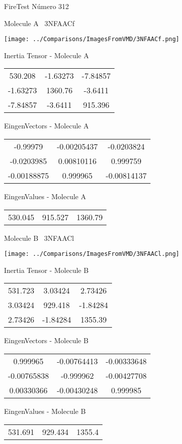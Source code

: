 \vtab[-3cm]
\begin{center}
{\large FireTest \tab Número 312}
\end{center}
\begin{multicols}{2}
\begin{center}

Molecule A \
3NFAACf

\texttt{[image: ../Comparisons/ImagesFromVMD/3NFAACf.png]}

Inertia Tensor - Molecule A \\
\begin{tabular}{|c c c|}
530.208	 & 	-1.63273	 & 	-7.84857	 \\
-1.63273	 & 	1360.76	 & 	-3.6411	 \\
-7.84857	 & 	-3.6411	 & 	915.396
\end{tabular}

\vtab
 EingenVectors - Molecule A     \\
\begin{tabular}{|c c c|}
-0.99979	 & 	-0.00205437	 & 	-0.0203824	 \\
-0.0203985	 & 	0.00810116	 & 	0.999759	 \\
-0.00188875	 & 	0.999965	 & 	-0.00814137
\end{tabular}

\vtab
 EingenValues - Molecule A     \\
\begin{tabular}{|c c c|}
530.045	 & 	915.527	 & 	1360.79	 \\
\end{tabular}
\columnbreak

Molecule B \
3NFAACl

\texttt{[image: ../Comparisons/ImagesFromVMD/3NFAACl.png]}

Inertia Tensor - Molecule B \\
\begin{tabular}{|c c c|}
531.723	 & 	3.03424	 & 	2.73426	 \\
3.03424	 & 	929.418	 & 	-1.84284	 \\
2.73426	 & 	-1.84284	 & 	1355.39
\end{tabular}

\vtab
 EingenVectors - Molecule B     \\
\begin{tabular}{|c c c|}
0.999965	 & 	-0.00764413	 & 	-0.00333648	 \\
-0.00765838	 & 	-0.999962	 & 	-0.00427708	 \\
0.00330366	 & 	-0.00430248	 & 	0.999985
\end{tabular}

\vtab
 EingenValues - Molecule B     \\
\begin{tabular}{|c c c|}
531.691	 & 	929.434	 & 	1355.4	 \\
\end{tabular}

\end{center}
\end{multicols}

